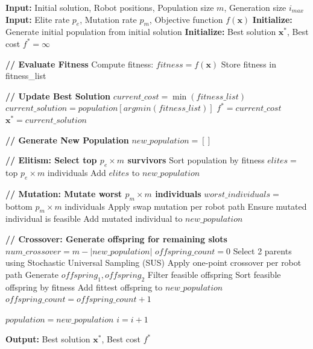 \begin{algorithm}[H]
\caption{Genetic Algorithm for Multi-Robot Path Planning}
\begin{algorithmic}[1]
\State \textbf{Input:} Initial solution, Robot positions, Population size $m$, Generation size $i_{max}$
\State \textbf{Input:} Elite rate $p_e$, Mutation rate $p_m$, Objective function $f(\mathbf{x})$
\State \textbf{Initialize:} Generate initial population from initial solution
\State \textbf{Initialize:} Best solution $\mathbf{x}^*$, Best cost $f^* = \infty$

    \State \textbf{// Evaluate Fitness}
        \State Compute fitness: $fitness = f(\mathbf{x})$
        \State Store fitness in fitness\_list
    \EndFor
    
    \State \textbf{// Update Best Solution}
    \State $current\_cost = \min(fitness\_list)$
    \State $current\_solution = population[argmin(fitness\_list)]$
        \State $f^* = current\_cost$
        \State $\mathbf{x}^* = current\_solution$
    \EndIf
    
    \State \textbf{// Generate New Population}
    \State $new\_population = []$
    
    \State \textbf{// Elitism: Select top $p_e \times m$ survivors}
    \State Sort population by fitness
    \State $elites = $ top $p_e \times m$ individuals
    \State Add $elites$ to $new\_population$
    
    \State \textbf{// Mutation: Mutate worst $p_m \times m$ individuals}
    \State $worst\_individuals = $ bottom $p_m \times m$ individuals
        \State Apply swap mutation per robot path
        \State Ensure mutated individual is feasible
        \State Add mutated individual to $new\_population$
    \EndFor
    
    \State \textbf{// Crossover: Generate offspring for remaining slots}
    \State $num\_crossover = m - |new\_population|$
    \State $offspring\_count = 0$
        \State Select 2 parents using Stochastic Universal Sampling (SUS)
        \State Apply one-point crossover per robot path
        \State Generate $offspring_1, offspring_2$
        \State Filter feasible offspring
        \State Sort feasible offspring by fitness
            \State Add fittest offspring to $new\_population$
            \State $offspring\_count = offspring\_count + 1$
        \EndIf
    \EndWhile
    
    \State $population = new\_population$
    \State $i = i + 1$
\EndWhile

\State \textbf{Output:} Best solution $\mathbf{x}^*$, Best cost $f^*$
\end{algorithmic}
\end{algorithm}

